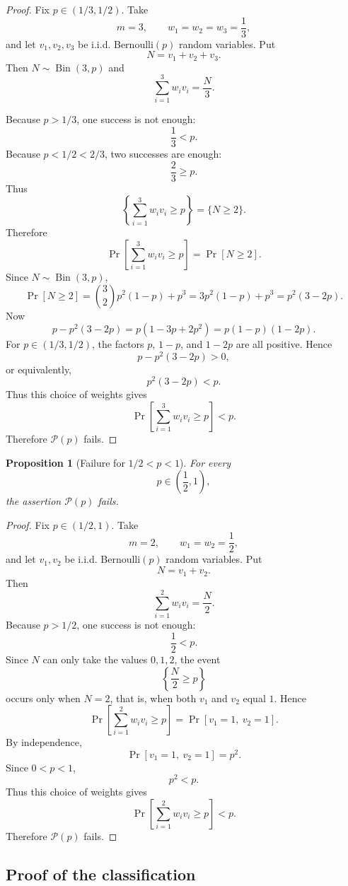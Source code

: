 \documentclass[12pt]{article}
\theoremstyle{definition}
\theoremstyle{plain}
\newtheorem{proposition}[definition]{Proposition}
\theoremstyle{remark}
\begin{document}
\begin{proof}
Fix \(p\in(1/3,1/2)\). Take
\[
m=3,\qquad w_1=w_2=w_3=\frac13,
\]
and let \(v_1,v_2,v_3\) be i.i.d. Bernoulli\((p)\) random variables. Put
\[
N=v_1+v_2+v_3.
\]
Then \(N\sim\operatorname{Bin}(3,p)\) and
\[
\sum_{i=1}^{3}w_i v_i=\frac{N}{3}.
\]

Because \(p>1/3\), one success is not enough:
\[
\frac13<p.
\]
Because \(p<1/2<2/3\), two successes are enough:
\[
\frac23\ge p.
\]
Thus
\[
\left\{\sum_{i=1}^{3}w_i v_i\ge p\right\}
=
\{N\ge2\}.
\]
Therefore
\[
\Pr\!\left[\sum_{i=1}^{3}w_i v_i\ge p\right]
=
\Pr[N\ge2].
\]
Since \(N\sim\operatorname{Bin}(3,p)\),
\[
\Pr[N\ge2]
=
\binom{3}{2}p^2(1-p)+p^3
=
3p^2(1-p)+p^3
=
p^2(3-2p).
\]
Now
\[
p-p^2(3-2p)
=
p(1-3p+2p^2)
=
p(1-p)(1-2p).
\]
For \(p\in(1/3,1/2)\), the factors \(p\), \(1-p\), and \(1-2p\) are all positive. Hence
\[
p-p^2(3-2p)>0,
\]
or equivalently,
\[
p^2(3-2p)<p.
\]
Thus this choice of weights gives
\[
\Pr\!\left[\sum_{i=1}^{3}w_i v_i\ge p\right]<p.
\]
Therefore \(\mathcal P(p)\) fails.
\end{proof}

\begin{proposition}[Failure for \(1/2<p<1\)]\label{prop:counterlarge}
For every
\[
p\in\left(\frac12,1\right),
\]
the assertion \(\mathcal P(p)\) fails.
\end{proposition}

\begin{proof}
Fix \(p\in(1/2,1)\). Take
\[
m=2,\qquad w_1=w_2=\frac12,
\]
and let \(v_1,v_2\) be i.i.d. Bernoulli\((p)\) random variables. Put
\[
N=v_1+v_2.
\]
Then
\[
\sum_{i=1}^{2}w_i v_i=\frac{N}{2}.
\]
Because \(p>1/2\), one success is not enough:
\[
\frac12<p.
\]
Since \(N\) can only take the values \(0,1,2\), the event
\[
\left\{\frac{N}{2}\ge p\right\}
\]
occurs only when \(N=2\), that is, when both \(v_1\) and \(v_2\) equal \(1\). Hence
\[
\Pr\!\left[\sum_{i=1}^{2}w_i v_i\ge p\right]
=
\Pr[v_1=1,\ v_2=1].
\]
By independence,
\[
\Pr[v_1=1,\ v_2=1]=p^2.
\]
Since \(0<p<1\),
\[
p^2<p.
\]
Thus this choice of weights gives
\[
\Pr\!\left[\sum_{i=1}^{2}w_i v_i\ge p\right]<p.
\]
Therefore \(\mathcal P(p)\) fails.
\end{proof}

\subsection{Proof of the classification}
\end{document}
